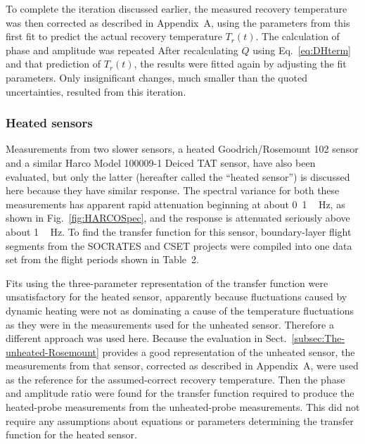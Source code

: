 \documentclass[amt, manuscript]{copernicus}
\begin{document}
To complete the iteration discussed earlier, the measured recovery
temperature was then corrected as described in Appendix~A, using the
parameters from this first fit to predict the actual recovery
temperature \(T_{r}(t)\). The calculation of phase and amplitude was
repeated After recalculating \(Q\) using Eq.~\eqref{eq:DHterm} and that
prediction of \(T_{r}(t)\), the results were fitted again by adjusting
the fit parameters. Only insignificant changes, much smaller than the
quoted uncertainties, resulted from this iteration.

\subsubsection{\texorpdfstring{Heated
sensors\label{subsec:Heated-sensors}}{Heated sensors}}

Measurements from two slower sensors, a heated Goodrich/Rosemount 102
sensor and a similar Harco Model 100009-1 Deiced TAT sensor, have also
been evaluated, but only the latter (hereafter called the ``heated
sensor'') is discussed here because they have similar response. The
spectral variance for both these measurements has apparent rapid
attenuation beginning at about \unit{0.1\,Hz}, as shown in
Fig.~\ref{fig:HARCOSpec}, and the response is attenuated seriously above
about \unit{1\,Hz}. To find the transfer function for this sensor,
boundary-layer flight segments from the SOCRATES and CSET projects were
compiled into one data set from the flight periods shown in Table~2.

Fits using the three-parameter representation of the transfer function
were unsatisfactory for the heated sensor, apparently because
fluctuations caused by dynamic heating were not as dominating a cause of
the temperature fluctuations as they were in the measurements used for
the unheated sensor. Therefore a different approach was used here.
Because the evaluation in Sect.~\ref{subsec:The-unheated-Rosemount}
provides a good representation of the unheated sensor, the measurements
from that sensor, corrected as described in Appendix~A, were used as the
reference for the assumed-correct recovery temperature. Then the phase
and amplitude ratio were found for the transfer function required to
produce the heated-probe measurements from the unheated-probe
measurements. This did not require any assumptions about equations or
parameters determining the transfer function for the heated sensor.
\end{document}
